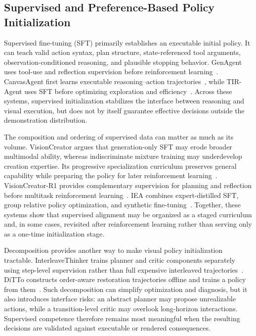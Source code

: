 \subsection{Supervised and Preference-Based Policy Initialization}
\label{subsec:policy-initialization}

Supervised fine-tuning (SFT) primarily establishes an executable initial policy. It can teach valid action syntax, plan structure, state-referenced tool arguments, observation-conditioned reasoning, and plausible stopping behavior. GenAgent uses tool-use and reflection supervision before reinforcement learning~\cite{jiang2026genagent}. CanvasAgent first learns executable reasoning--action trajectories~\cite{avg260705465}, while TIR-Agent uses SFT before optimizing exploration and efficiency~\cite{avg260327742}. Across these systems, supervised initialization stabilizes the interface between reasoning and visual execution, but does not by itself guarantee effective decisions outside the demonstration distribution.

The composition and ordering of supervised data can matter as much as its volume. VisionCreator argues that generation-only SFT may erode broader multimodal ability, whereas indiscriminate mixture training may underdevelop creation expertise. Its progressive specialization curriculum preserves general capability while preparing the policy for later reinforcement learning~\cite{avg260302681}. VisionCreator-R1 provides complementary supervision for planning and reflection before multitask reinforcement learning~\cite{avg260308812}. IEA combines expert-distilled SFT, group relative policy optimization, and synthetic fine-tuning~\cite{avg260608016}. Together, these systems show that supervised alignment may be organized as a staged curriculum and, in some cases, revisited after reinforcement learning rather than serving only as a one-time initialization stage.

Decomposition provides another way to make visual policy initialization tractable. InterleaveThinker trains planner and critic components separately using step-level supervision rather than full expensive interleaved trajectories~\cite{avg260613679}. DiTTo constructs order-aware restoration trajectories offline and trains a policy from them~\cite{avg260530915}. Such decomposition can simplify optimization and diagnosis, but it also introduces interface risks: an abstract planner may propose unrealizable actions, while a transition-level critic may overlook long-horizon interactions. Supervised competence therefore remains most meaningful when the resulting decisions are validated against executable or rendered consequences.


